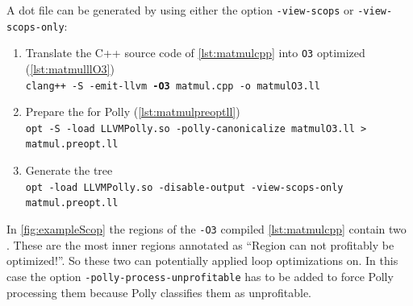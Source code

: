 A dot file can be generated by using either the option \texttt{-view-scops} or \texttt{-view-scops-only}:
\begin{sloppypar}
    \begin{enumerate}
        \item Translate the C++ source code of \autoref{lst:matmulcpp} into \texttt{O3} optimized \llvmir (\autoref{lst:matmulllO3})\\
            \texttt{clang++ -S -emit-llvm \textbf{-O3} matmul.cpp -o matmulO3.ll}
        \item Prepare the \llvmir for Polly (\autoref{lst:matmulpreoptll})\\
            \texttt{opt -S -load LLVMPolly.so -polly-canonicalize matmulO3.ll > matmul.preopt.ll}
        \item Generate the \scop tree\\
            \texttt{opt -load LLVMPolly.so -disable-output -view-scops-only matmul.preopt.ll}
    \end{enumerate}
    In \autoref{fig:exampleScop} the regions of the \texttt{-O3} compiled \autoref{lst:matmulcpp} contain two \scops.
    These are the most inner regions annotated as \enquote{Region can not profitably be optimized!}.
    So these two can potentially applied loop optimizations on.
    In this case the option \texttt{-polly-process-unprofitable} has to be added to force Polly processing them because Polly classifies them as unprofitable.
\end{sloppypar}

